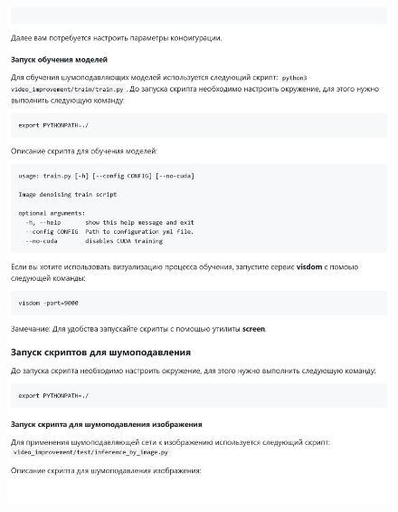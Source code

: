 \documentclass[14pt]{mmcs_article}
\begin{document}
\begin{appendices}
\begin{figure}[h]
	\centering
	\includegraphics[width=\textwidth]{img/markdown/README_3}
	\label{fig:markdown_3}
\end{figure}


\end{appendices}
\end{document}
